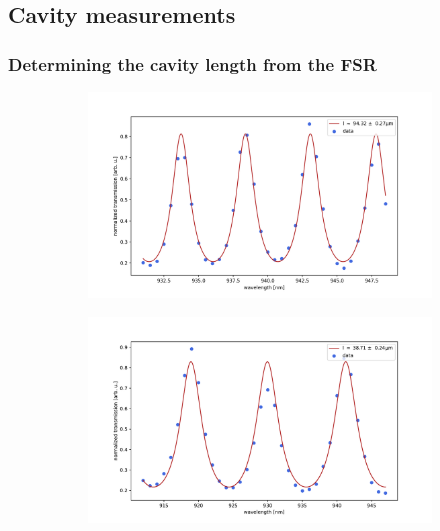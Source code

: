 \subsection{Cavity measurements}\label{sec:cavity_measurements}

\subsubsection{Determining the cavity length from the FSR}

\begin{figure}[h!]
    \centering
    \begin{subfigure}[b]{0.45\textwidth}
        \includegraphics[width=\textwidth]{figures/length_from_fsr_example_100um.png}
        \caption{}
        \label{fig:100um_FSR}
    \end{subfigure}
    \begin{subfigure}[b]{0.45\textwidth}
        \includegraphics[width=\textwidth]{figures/length_from_fsr_example_40um.pdf}
        \caption{}
        \label{fig:40um_FSR}
    \end{subfigure}
    \caption{}
    \label{fig:length_from_long_scan_example}    
\end{figure}

